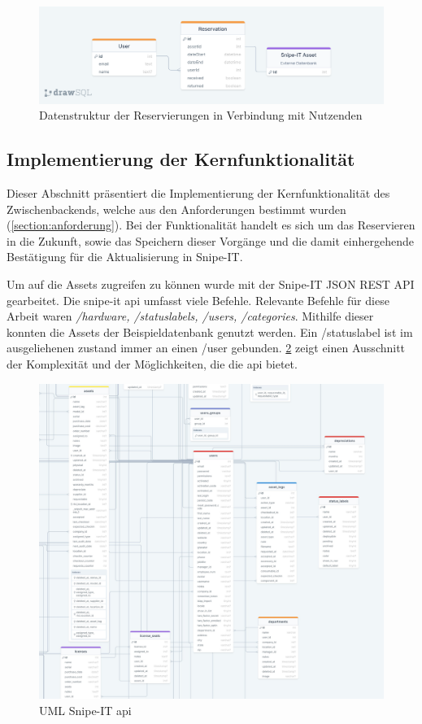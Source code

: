 \begin{figure}[h]
  \centering
  \includegraphics[scale=0.2]{Bilder/drawSQL-export-2022-10-09_15 56.png}
  \caption[Datenstruktur der Reservierungen in Verbindung mit Nutzenden]{Datenstruktur der Reservierungen in Verbindung mit Nutzenden}
  \label{fig:orm}
\end{figure}


\subsection{Implementierung der Kernfunktionalität}
Dieser Abschnitt präsentiert die Implementierung der Kernfunktionalität des
Zwischenbackends, welche aus den Anforderungen  bestimmt wurden
(\ref{section:anforderung}). Bei der Funktionalität handelt es sich um das
Reservieren in die Zukunft, sowie das Speichern dieser Vorgänge und die damit
einhergehende Bestätigung für die Aktualisierung in Snipe-IT.

Um auf die Assets zugreifen zu können wurde mit der Snipe-IT JSON REST API gearbeitet. Die snipe-it
api umfasst viele Befehle. Relevante Befehle für diese Arbeit waren \textit{/hardware,
/statuslabels, /users, /categories}. Mithilfe dieser konnten die Assets der Beispieldatenbank
genutzt werden. Ein /statuslabel ist im ausgeliehenen zustand immer an einen /user gebunden.
\ref{fig:snipe} zeigt einen Ausschnitt der Komplexität und der Möglichkeiten, die die api bietet.

\begin{figure}[h]
  \centering
  \includegraphics[scale=0.3]{Bilder/snipe.jpg}
  \caption[UML Snipe-IT api]{UML Snipe-IT api}
  \label{fig:snipe}
\end{figure}


